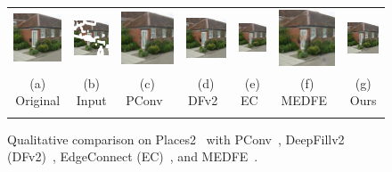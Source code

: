 \documentclass[10pt,journal,compsoc]{IEEEtran}
\begin{document}
\begin{figure}[hbt]
\begin{tabular}{ccccccc}
		\includegraphics[width=.135\textwidth]{places/GT2-0}  &
		\includegraphics[width=.135\textwidth]{places/input2-0}  &
		\includegraphics[width=.135\textwidth]{places/pconv2-0}  &
		\includegraphics[width=.135\textwidth]{places/gc2-0}  &
		\includegraphics[width=.135\textwidth]{places/ec2-0}  &
		\includegraphics[width=.135\textwidth]{places/MEDFE2-0}  &
		\includegraphics[width=.135\textwidth]{places/ours2-0}  \\
		
		\scriptsize{(a) Original} & \scriptsize{(b) Input} & \scriptsize{(c) PConv~\cite{partialconv2017}} & \scriptsize{(d) DFv2~\cite{yu2018free}} & \scriptsize{(e) EC~\cite{nazeri2019edgeconnect}} & \scriptsize{(f) MEDFE~\cite{liu2020rethinking}}  &\scriptsize{(g) Ours} \\
		\vspace{-2mm}
	\end{tabular}
	\caption{Qualitative comparison on Places2~\cite{zhou2017places} with PConv~\cite{partialconv2017}, DeepFillv2 (DFv2)~\cite{yu2018free}, EdgeConnect (EC)~\cite{nazeri2019edgeconnect}, and MEDFE~\cite{liu2020rethinking}.}
	\label{fig:places}
\end{figure}
\end{document}

